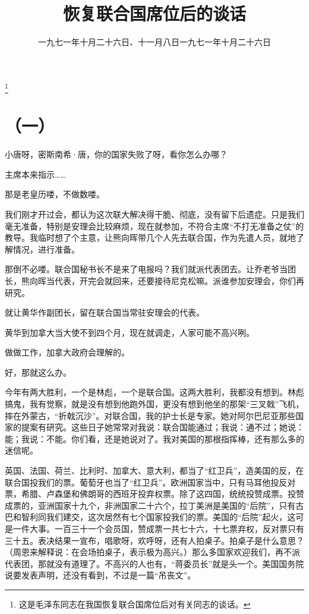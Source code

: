 
\title{恢复联合国席位后的谈话}
\date{一九七一年十月二十六日、十一月八日}
\thanks{这是毛泽东同志在我国恢复联合国席位后对有关同志的谈话。}
\maketitle


\date{一九七一年十月二十六日}
\section*{（一）}

小唐呀，密斯南希·唐，你的国家失败了呀，看你怎么办哪？

主席本来指示……

那是老皇历喽，不做数喽。

我们刚才开过会，都认为这次联大解决得干脆、彻底，没有留下后遗症。只是我们毫无准备，特别是安理会比较麻烦，现在就参加，不符合主席“不打无准备之仗”的教导。我临时想了个主意，让熊向晖带几个人先去联合国，作为先遣人员，就地了解情况，进行准备。

那倒不必喽。联合国秘书长不是来了电报吗？我们就派代表团去。让乔老爷当团长，熊向晖当代表，开完会就回来，还要接待尼克松嘛。派谁参加安理会，你们再研究。

就让黄华作副团长，留在联合国当常驻安理会的代表。

黄华到加拿大当大使不到四个月，现在就调走，人家可能不高兴咧。

做做工作，加拿大政府会理解的。

好，那就这么办。

今年有两大胜利，一个是林彪，一个是联合国。这两大胜利，我都没有想到。林彪搞鬼，我有觉察，就是没有想到他跑外国，更没有想到他坐的那架“三叉戟”飞机，摔在外蒙古，“折戟沉沙”。对联合国，我的护士长是专家。她对阿尔巴尼亚那些国家的提案有研究。这些日子她常常对我说：联合国能通过；我说：通不过；她说：能；我说：不能。你们看，还是她说对了。我对美国的那根指挥棒，还有那么多的迷信呢。

英国、法国、荷兰、比利时、加拿大、意大利，都当了“红卫兵”，造美国的反，在联合国投我们的票。葡萄牙也当了“红卫兵”。欧洲国家当中，只有马耳他投反对票，希腊、卢森堡和佛朗哥的西班牙投弃权票。除了这四国，统统投赞成票。投赞成票的，亚洲国家十九个，非洲国家二十六个，拉丁美洲是美国的“后院”，只有古巴和智利同我们建交，这次居然有七个国家投我们的票。美国的“后院”起火，这可是一件大事。一百三十一个会员国，赞成票一共七十六，十七票弃权，反对票只有三十五。表决结果一宣布，唱歌呀，欢呼呀，还有人拍桌子。拍桌子是什么意思？（周恩来解释说：在会场拍桌子，表示极为高兴。）那么多国家欢迎我们，再不派代表团，那就没有道理了。不高兴的人也有，“蒋委员长”就是头一个。美国国务院说要发表声明，还没有看到，不过是一篇“吊丧文”。

